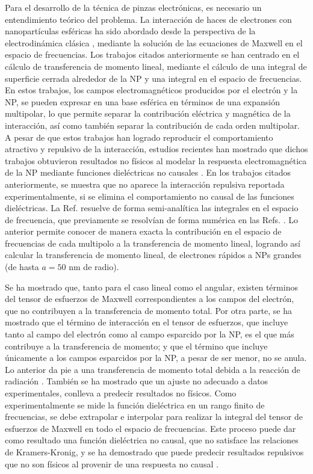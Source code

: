 \documentclass[letter,12pt]{article}
\numberwithin{equation}{section}
\begin{document}
Para el desarrollo de la técnica de pinzas electrónicas, es necesario un entendimiento teórico del problema. La interacción de haces de electrones con nanopartículas esféricas ha sido abordado desde la perspectiva de la electrodinámica clásica \cite{GarciadeAbajo0, PRBCoronado, Lagos2, Batson2, xu2010transmission}, mediante la solución de las ecuaciones de Maxwell en el espacio de frecuencias. Los trabajos citados anteriormente se han centrado en el cálculo de transferencia de momento lineal, mediante el cálculo de una integral de superficie cerrada alrededor de la NP y una integral en el espacio de frecuencias. En estos trabajos, los campos electromagnéticos producidos por el electrón y la NP, se pueden expresar en una base esférica en términos de una expansión multipolar, lo que permite separar la contribución eléctrica y magnética de la interacción, así como también separar la contribución de cada orden multipolar. A pesar de que estos trabajos han logrado reproducir el comportamiento atractivo y repulsivo de la interacción, estudios recientes han mostrado que dichos trabajos obtuvieron resultados no físicos al modelar la respuesta electromagnética de la NP mediante funciones dieléctricas no causales \cite{castrejon2021effects, castrejon2021phdthesis}. En los trabajos citados anteriormente, se muestra que no aparece la interacción repulsiva reportada experimentalmente, si se elimina el comportamiento no causal de las funciones dieléctricas. La Ref. \cite{castrejon2021phdthesis} resuelve de forma semi-analítica las integrales en el espacio de frecuencia, que previamente se resolvían de forma numérica en las Refs. \cite{GarciadeAbajo0, PRBCoronado, Lagos2, Batson2, xu2010transmission}. Lo anterior permite conocer de manera exacta la contribución en el espacio de frecuencias de cada multipolo a la transferencia de momento lineal, logrando así calcular la transferencia de momento lineal, de electrones rápidos a NPs grandes (de hasta $a=50$ nm de radio). 

Se ha mostrado que, tanto para el caso lineal como el angular, existen términos del tensor de esfuerzos de Maxwell correspondientes a los campos del electrón, que no contribuyen a la transferencia de momento total. Por otra parte, se ha mostrado que el término de interacción en el tensor de esfuerzos, que incluye tanto al campo del electrón como al campo esparcido por la NP, es el que más contribuye a la transferencia de momento; y que el término que incluye únicamente a los campos esparcidos por la NP, a pesar de ser menor, no se anula. Lo anterior da pie a una transferencia de momento total debida a la reacción de radiación \cite{castellanos2021phdthesis, castrejon2021phdthesis}. También se ha mostrado que un ajuste no adecuado a datos experimentales, conlleva a predecir resultados no físicos. Como experimentalmente se mide la función dieléctrica en un rango finito de frecuencias, se debe extrapolar e interpolar para realizar la integral del tensor de esfuerzos de Maxwell en todo el espacio de frecuencias. Este proceso puede dar como resultado una función dieléctrica no causal, que no satisface las relaciones de Kramers-Kronig, y se ha demostrado que puede predecir resultados repulsivos que no son físicos al provenir de una respuesta no causal \cite{castrejon2021phdthesis}. 
\end{document}
